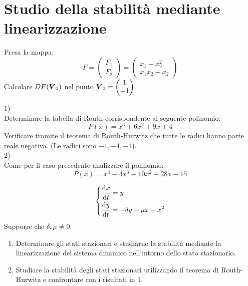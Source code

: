 \section{Studio della stabilità mediante linearizzazione}%
\begin{ex}[Calcolo di DF]
    Presa la mappa:
    \[
        F = \begin{pmatrix} F_1 \\ F_2 \end{pmatrix} = 
	\begin{pmatrix} x_1 -x_2^2 \\ x_1x_2-x_2 \end{pmatrix} 
    \] 
    Calcolare $DF(\boldsymbol{V}_0)$ nel punto $\boldsymbol{V}_0=\begin{pmatrix} 1\\ -1 \end{pmatrix} $.
\end{ex}
\noindent
\begin{ex}
    1) \\
    Determinare la tabella di Routh corrispondente al seguente polinomio:
    \[
	P(x) = x^3 + 6 x^2 + 9 x + 4
    \] 
    Verificare tramite il teorema di Routh-Hurwitz che tutte le radici hanno parte reale negativa. (Le radici sono $-1, -4, -1$).\\
    2) \\
    Come per il caso precedente analizzare il polinomio:
    \[
	P(x)=x^4-4x^3 - 10 x^2 + 28x - 15
    \] 
\end{ex}
\begin{ex}
    \[\begin{dcases}
        \frac{\text{d} x}{\text{d} t} = y\\
	\frac{\text{d} y}{\text{d} t} = - \delta y - \mu x - x^2
    \end{dcases}\] 
    Supporre che $\delta, \mu  \neq 0$. 
    \begin{enumerate}
        \item Determinare gli stati stazionari e studiarne la stabilità mediante la linearizzazione del sistema dinamico nell'intorno dello stato stazionario.
	\item Studiare la stabilità degli stati stazionari utilizzando il teorema di Routh-Hurwitz e confrontare con i risultati in 1.
    \end{enumerate}
\end{ex}
\noindent
